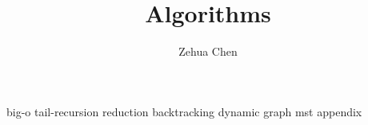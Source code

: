 \documentclass[letterpaper, 11pt]{report}
\title{Algorithms}
\author{Zehua Chen}
\begin{document}
  \maketitle
  \tableofcontents

  {big-o}
  {tail-recursion}
  {reduction}
  {backtracking}
  {dynamic}
  {graph}
  {mst}
  {appendix}
\end{document}

